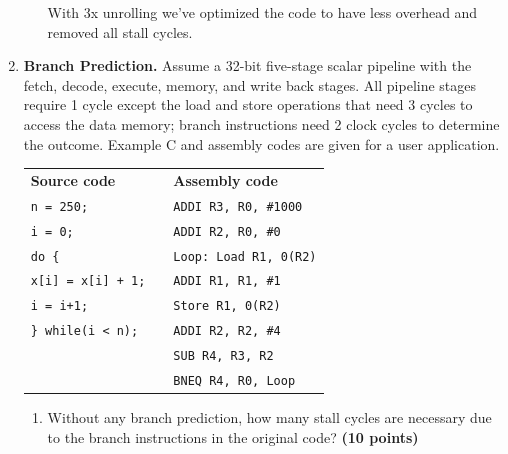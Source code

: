\documentclass[a4paper, 11pt]{exam}
\begin{document}
\begin{enumerate}
\begin{enumerate}
With 3x unrolling we've optimized the code to have less overhead and removed all stall cycles.

\end{enumerate}

\item \textbf{Branch Prediction.}
Assume a 32-bit five-stage scalar pipeline with the fetch, decode, execute, memory, and write back stages.
All pipeline stages require 1 cycle except the load and store operations that need 3 cycles to access the data memory; branch instructions need 2 clock cycles to determine the outcome.
Example C and assembly codes are given for a user application.

\begin{tabular}{lll}
	\textbf{Source code} & & \textbf{Assembly code }\\
	\texttt{n = 250;}&  &\hspace{40pt}\texttt{ADDI R3, R0, \#1000} \\
	\texttt{i = 0;} &  &\hspace{40pt}\texttt{ADDI R2, R0, \#0}\\
	\texttt{do \{} &  &\texttt{Loop: Load  R1, 0(R2)} \\
	\hspace{20pt}\texttt{x[i] = x[i] + 1;}&  &\hspace{40pt}\texttt{ADDI   R1, R1, \#1}\\
	\hspace{20pt}\texttt{i = i+1;}&  &\hspace{40pt}\texttt{Store  R1, 0(R2)}\\
	\texttt{\} while(i < n);}&  &\hspace{40pt}\texttt{ADDI R2, R2, \#4}\\
	&  &\hspace{40pt}\texttt{SUB R4, R3, R2}\\
	&  &\hspace{40pt}\texttt{BNEQ R4, R0, Loop}\\
\end{tabular}

\begin{enumerate}
	\item  Without any branch prediction, how many stall cycles are necessary due to the branch instructions in the original code? \textbf {(10 points)}
	
\hfill
 

\end{enumerate}
\end{enumerate}
\end{document}
